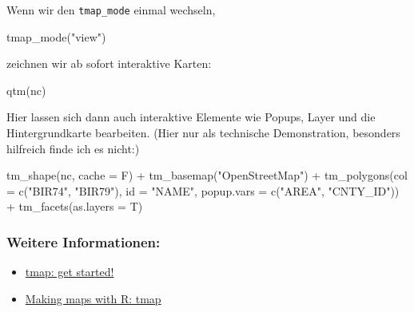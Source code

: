 \documentclass[
  ngerman,
]{article}
\newenvironment{Shaded}{\begin{snugshade}}{\end{snugshade}}
\newcommand{\AttributeTok}[1]{\textcolor[rgb]{0.77,0.63,0.00}{#1}}
\newcommand{\FunctionTok}[1]{\textcolor[rgb]{0.00,0.00,0.00}{#1}}
\newcommand{\NormalTok}[1]{#1}
\newcommand{\SpecialCharTok}[1]{\textcolor[rgb]{0.00,0.00,0.00}{#1}}
\newcommand{\StringTok}[1]{\textcolor[rgb]{0.31,0.60,0.02}{#1}}
\providecommand{\tightlist}{%
  \setlength{\itemsep}{0pt}\setlength{\parskip}{0pt}}
\begin{document}
Wenn wir den \texttt{tmap\_mode} einmal wechseln,

\begin{Shaded}
\begin{Highlighting}[]
\FunctionTok{tmap\_mode}\NormalTok{(}\StringTok{"view"}\NormalTok{)}
\end{Highlighting}
\end{Shaded}

zeichnen wir ab sofort interaktive Karten:

\begin{Shaded}
\begin{Highlighting}[]
\FunctionTok{qtm}\NormalTok{(nc)}
\end{Highlighting}
\end{Shaded}

Hier lassen sich dann auch interaktive Elemente wie Popups, Layer und die Hintergrundkarte bearbeiten. (Hier nur als technische Demonstration, besonders hilfreich finde ich es nicht:)

\begin{Shaded}
\begin{Highlighting}[]
\FunctionTok{tm\_shape}\NormalTok{(nc, }\AttributeTok{cache =}\NormalTok{ F) }\SpecialCharTok{+}
  \FunctionTok{tm\_basemap}\NormalTok{(}\StringTok{"OpenStreetMap"}\NormalTok{) }\SpecialCharTok{+}
  \FunctionTok{tm\_polygons}\NormalTok{(}\AttributeTok{col =} \FunctionTok{c}\NormalTok{(}\StringTok{"BIR74"}\NormalTok{, }\StringTok{"BIR79"}\NormalTok{), }\AttributeTok{id =} \StringTok{"NAME"}\NormalTok{, }\AttributeTok{popup.vars =} \FunctionTok{c}\NormalTok{(}\StringTok{"AREA"}\NormalTok{, }\StringTok{"CNTY\_ID"}\NormalTok{)) }\SpecialCharTok{+}
  \FunctionTok{tm\_facets}\NormalTok{(}\AttributeTok{as.layers =}\NormalTok{ T)}
\end{Highlighting}
\end{Shaded}

\hypertarget{weitere-informationen}{%
\subsubsection{Weitere Informationen:}\label{weitere-informationen}}

\begin{itemize}
\tightlist
\item
  \href{https://cran.r-project.org/web/packages/tmap/vignettes/tmap-getstarted.html}{tmap: get started!}
\item
  \href{https://bookdown.org/nicohahn/making_maps_with_r5/docs/tmap.html}{Making maps with R: tmap}
\end{itemize}
\end{document}
